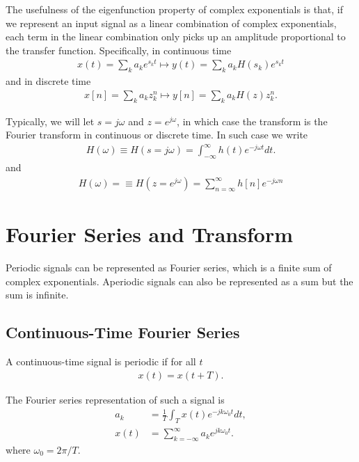 \documentclass{article}
\begin{document}
The usefulness of the eigenfunction property of complex exponentials is that, if we represent
an input signal as a linear combination of complex exponentials, each term in the linear combination
only picks up an amplitude proportional to the transfer function. Specifically, in continuous time
\begin{align}
    x(t) = \sum_k a_k e^{s_kt} \longmapsto y(t) = \sum_k a_k H(s_k) e^{s_kt}
\end{align}
and in discrete time
\begin{align}
    x[n] = \sum_k a_k z_k^n \longmapsto y[n] = \sum_k a_k H(z) z_k^n. 
\end{align}

Typically, we will let $s = j\omega$ and $z = e^{j\omega}$, in which case the transform is the Fourier transform in continuous or discrete time. In such case we write
\begin{align}
    H(\omega) \equiv H(s = j\omega) = \int_{-\infty}^\infty h(t) e^{-j\omega t} dt.
\end{align}
and
\begin{align}
    H(\omega) = \equiv H(z = e^{j\omega}) = \sum_{n=\infty}^\infty h[n] e^{-j\omega n}
\end{align}


\section{Fourier Series and Transform}

Periodic signals can be represented as Fourier series, which is a finite sum of complex exponentials.
Aperiodic signals can also be represented as a sum but the sum is infinite.

\subsection{Continuous-Time Fourier Series}

A continuous-time signal is periodic if for all $t$
\begin{align}
    x(t) = x(t + T).
\end{align}

The Fourier series representation of such a signal is
\begin{align}
    a_k &= \frac{1}{T} \int_T x(t) e^{-jk\omega_0t}dt, \label{eq:ctfs_ft}\\
    x(t) &= \sum_{k=-\infty}^\infty a_k e^{jk\omega_0t}. \label{eq:ctfs_ift}
\end{align}
where $\omega_0 = 2\pi/T$.
\end{document}
